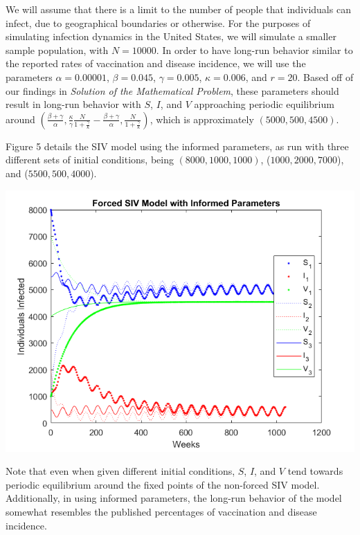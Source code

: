 \documentclass[12pt]{article}
\newenvironment{Figure}
  {\par\medskip\noindent\minipage{\linewidth}}
  {\endminipage\par\medskip}
\begin{document}
We will assume that there is a limit to the number of people that individuals can infect, due to geographical boundaries or otherwise. For the purposes of simulating infection dynamics in the United States, we will simulate a smaller sample population, with $N = 10000$. In order to have long-run behavior similar to the reported rates of vaccination and disease incidence, we will use the parameters $\alpha = 0.00001$, $\beta = 0.045$, $\gamma = 0.005$, $\kappa = 0.006$, and $r = 20$. Based off of our findings in \textit{Solution of the Mathematical Problem}, these parameters should result in long-run behavior with $S$, $I$, and $V$ approaching periodic equilibrium around $(\frac{\beta + \gamma}{\alpha}, \frac{\kappa}{\gamma}\frac{N}{1 + \frac{\gamma}{\kappa}} - \frac{\beta + \gamma}{\alpha}, \frac{N}{1 + \frac{\gamma}{\kappa}})$, which is approximately $(5000, 500, 4500)$.

Figure 5 details the SIV model using the informed parameters, as run with three different sets of initial conditions, being $(8000, 1000, 1000)$, ($1000, 2000, 7000$), and ($5500, 500, 4000$).

\begin{Figure}
    \centering
    \includegraphics[width = \linewidth]{informed_siv.png}
\end{Figure}

Note that even when given different initial conditions, $S$, $I$, and $V$ tend towards periodic equilibrium around the fixed points of the non-forced SIV model. Additionally, in using informed parameters, the long-run behavior of the model somewhat resembles the published percentages of vaccination and disease incidence.
\end{document}
